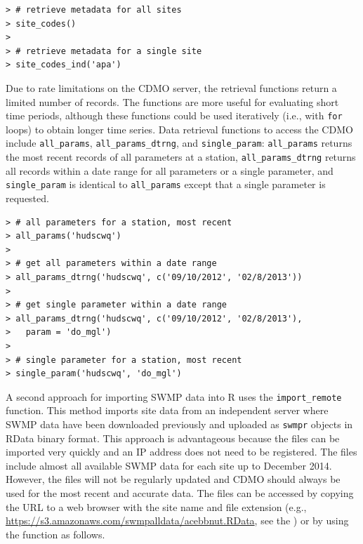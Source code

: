 \documentclass[10pt,letterpaper]{article}\usepackage[]{graphicx}\usepackage[]{color}
\makeatletter
\newenvironment{kframe}{%
 \def\at@end@of@kframe{}%
 \ifinner\ifhmode%
  \def\at@end@of@kframe{\end{minipage}}%
  \begin{minipage}{\columnwidth}%
 \fi\fi%
 \def\FrameCommand##1{\hskip\@totalleftmargin \hskip-\fboxsep
 \colorbox{shadecolor}{##1}\hskip-\fboxsep
     \hskip-\linewidth \hskip-\@totalleftmargin \hskip\columnwidth}%
 \MakeFramed {\advance\hsize-\width
   \@totalleftmargin\z@ \linewidth\hsize
   \@setminipage}}%
 {\par\unskip\endMakeFramed%
 \at@end@of@kframe}
\newenvironment{knitrout}{}{} %
\makeatother
\begin{document}
\begin{knitrout}
\color{fgcolor}\begin{kframe}
\begin{verbatim}
> # retrieve metadata for all sites
> site_codes()
> 
> # retrieve metadata for a single site
> site_codes_ind('apa')
\end{verbatim}
\end{kframe}
\end{knitrout}

Due to rate limitations on the \ac{CDMO} server, the retrieval functions return a limited number of records.  The functions are more useful for evaluating short time periods, although these functions could be used iteratively (i.e., with \texttt{for} loops) to obtain longer time series.  Data retrieval functions to access the \ac{CDMO} include \texttt{all\_params}, \texttt{all\_params\_dtrng}, and \texttt{single\_param}: \texttt{all\_params} returns the most recent records of all parameters at a station, \texttt{all\_params\_dtrng} returns all records within a date range for all parameters or a single parameter, and \texttt{single\_param} is identical to \texttt{all\_params} except that a single parameter is requested.    

\begin{knitrout}
\color{fgcolor}\begin{kframe}
\begin{verbatim}
> # all parameters for a station, most recent
> all_params('hudscwq')
> 
> # get all parameters within a date range
> all_params_dtrng('hudscwq', c('09/10/2012', '02/8/2013'))
> 
> # get single parameter within a date range
> all_params_dtrng('hudscwq', c('09/10/2012', '02/8/2013'), 
>   param = 'do_mgl')
> 
> # single parameter for a station, most recent
> single_param('hudscwq', 'do_mgl')
\end{verbatim}
\end{kframe}
\end{knitrout}

A second approach for importing \ac{SWMP} data into R uses the \texttt{import\_remote} function.  This method imports site data from an independent server where \ac{SWMP} data have been downloaded previously and uploaded as \texttt{swmpr} objects in RData binary format.  This approach is advantageous because the files can be imported very quickly and an IP address does not need to be registered.  The files include almost all available \ac{SWMP} data for each site up to December 2014.  However, the files will not be regularly updated and \ac{CDMO} should always be used for the most recent and accurate data.  The files can be accessed by copying the URL to a web browser with the site name and file extension (e.g., \href{https://s3.amazonaws.com/swmpalldata/acebbnut.RData}{https://s3.amazonaws.com/swmpalldata/acebbnut.RData}, see the ) or by using the function as follows.
\end{document}

